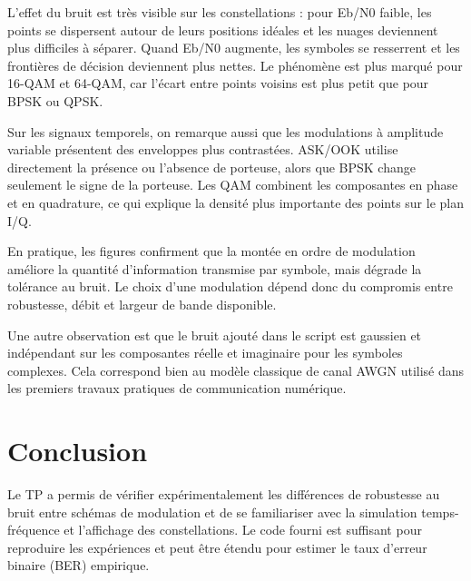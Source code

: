 \documentclass[11pt,a4paper,twocolumn]{article}
\begin{document}
L'effet du bruit est très visible sur les constellations : pour Eb/N0 faible, les points se dispersent autour de leurs positions idéales et les nuages deviennent plus difficiles à séparer. Quand Eb/N0 augmente, les symboles se resserrent et les frontières de décision deviennent plus nettes. Le phénomène est plus marqué pour 16-QAM et 64-QAM, car l'écart entre points voisins est plus petit que pour BPSK ou QPSK.

Sur les signaux temporels, on remarque aussi que les modulations à amplitude variable présentent des enveloppes plus contrastées. ASK/OOK utilise directement la présence ou l'absence de porteuse, alors que BPSK change seulement le signe de la porteuse. Les QAM combinent les composantes en phase et en quadrature, ce qui explique la densité plus importante des points sur le plan I/Q.

En pratique, les figures confirment que la montée en ordre de modulation améliore la quantité d'information transmise par symbole, mais dégrade la tolérance au bruit. Le choix d'une modulation dépend donc du compromis entre robustesse, débit et largeur de bande disponible.

Une autre observation est que le bruit ajouté dans le script est gaussien et indépendant sur les composantes réelle et imaginaire pour les symboles complexes. Cela correspond bien au modèle classique de canal AWGN utilisé dans les premiers travaux pratiques de communication numérique.

\section*{Conclusion}
Le TP a permis de vérifier expérimentalement les différences de robustesse au bruit entre schémas de modulation et de se familiariser avec la simulation temps-fréquence et l'affichage des constellations. Le code fourni est suffisant pour reproduire les expériences et peut être étendu pour estimer le taux d'erreur binaire (BER) empirique.
\end{document}
